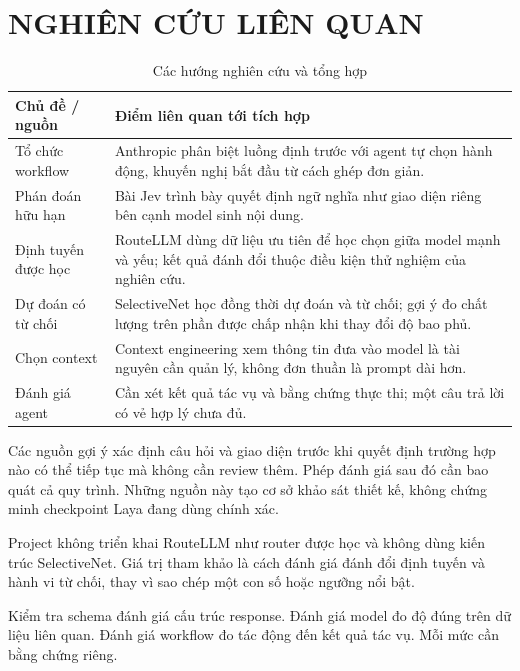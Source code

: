 \documentclass[10pt,a4paper]{article}
\begin{document}
\section{NGHIÊN CỨU LIÊN QUAN}
\begin{table}[H]
\centering\small
\renewcommand{\arraystretch}{1.15}
\begin{tabularx}{\linewidth}{@{}YY@{}}
\toprule
\textbf{Chủ đề / nguồn} & \textbf{Điểm liên quan tới tích hợp} \\
\midrule
Tổ chức workflow \cite{r7} & Anthropic phân biệt luồng định trước với agent tự chọn hành động, khuyến nghị bắt đầu từ cách ghép đơn giản. \\
Phán đoán hữu hạn \cite{r1} & Bài Jev trình bày quyết định ngữ nghĩa như giao diện riêng bên cạnh model sinh nội dung. \\
Định tuyến được học \cite{r8} & RouteLLM dùng dữ liệu ưu tiên để học chọn giữa model mạnh và yếu; kết quả đánh đổi thuộc điều kiện thử nghiệm của nghiên cứu. \\
Dự đoán có từ chối \cite{r9} & SelectiveNet học đồng thời dự đoán và từ chối; gợi ý đo chất lượng trên phần được chấp nhận khi thay đổi độ bao phủ. \\
Chọn context \cite{r10} & Context engineering xem thông tin đưa vào model là tài nguyên cần quản lý, không đơn thuần là prompt dài hơn. \\
Đánh giá agent \cite{r11} & Cần xét kết quả tác vụ và bằng chứng thực thi; một câu trả lời có vẻ hợp lý chưa đủ. \\
\bottomrule
\end{tabularx}
\caption{Các hướng nghiên cứu và tổng hợp}
\end{table}
Các nguồn gợi ý xác định câu hỏi và giao diện trước khi quyết định trường hợp nào có thể tiếp tục mà không cần review thêm. Phép đánh giá sau đó cần bao quát cả quy trình. Những nguồn này tạo cơ sở khảo sát thiết kế, không chứng minh checkpoint Laya đang dùng chính xác.

Project không triển khai RouteLLM như router được học và không dùng kiến trúc SelectiveNet. Giá trị tham khảo là cách đánh giá đánh đổi định tuyến và hành vi từ chối, thay vì sao chép một con số hoặc ngưỡng nổi bật.

Kiểm tra schema đánh giá cấu trúc response. Đánh giá model đo độ đúng trên dữ liệu liên quan. Đánh giá workflow đo tác động đến kết quả tác vụ. Mỗi mức cần bằng chứng riêng.
\end{document}

